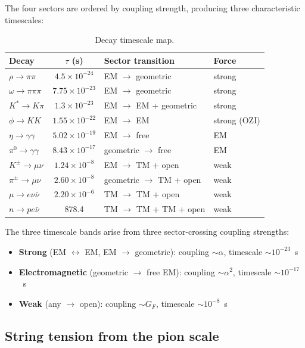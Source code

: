 \documentclass[11pt,a4paper]{article}
\begin{document}
The four sectors are ordered by coupling strength, producing three characteristic timescales:

\begin{table}[h]
\centering
\caption{Decay timescale map.}
\label{tab:timescales}
\small
\begin{tabular}{@{}lcll@{}}
\toprule
Decay & $\tau$ (s) & Sector transition & Force \\
\midrule
$\rho \to \pi\pi$ & $4.5 \times 10^{-24}$ & EM $\to$ geometric & strong \\
$\omega \to \pi\pi\pi$ & $7.75 \times 10^{-23}$ & EM $\to$ geometric & strong \\
$K^* \to K\pi$ & $1.3 \times 10^{-23}$ & EM $\to$ EM + geometric & strong \\
$\phi \to KK$ & $1.55 \times 10^{-22}$ & EM $\to$ EM & strong (OZI) \\
$\eta \to \gamma\gamma$ & $5.02 \times 10^{-19}$ & EM $\to$ free & EM \\
$\pi^0 \to \gamma\gamma$ & $8.43 \times 10^{-17}$ & geometric $\to$ free & EM \\
$K^\pm \to \mu\nu$ & $1.24 \times 10^{-8}$ & EM $\to$ TM + open & weak \\
$\pi^\pm \to \mu\nu$ & $2.60 \times 10^{-8}$ & geometric $\to$ TM + open & weak \\
$\mu \to e\nu\bar\nu$ & $2.20 \times 10^{-6}$ & TM $\to$ TM + open & weak \\
$n \to pe\bar\nu$ & 878.4 & TM $\to$ TM + TM + open & weak \\
\bottomrule
\end{tabular}
\end{table}

The three timescale bands arise from three sector-crossing coupling strengths:
\begin{itemize}
  \item \textbf{Strong} (EM $\leftrightarrow$ EM, EM $\to$ geometric): coupling $\sim \alpha$, timescale $\sim 10^{-23}$~s
  \item \textbf{Electromagnetic} (geometric $\to$ free EM): coupling $\sim \alpha^2$, timescale $\sim 10^{-17}$~s
  \item \textbf{Weak} (any $\to$ open): coupling $\sim G_F$, timescale $\sim 10^{-8}$~s
\end{itemize}

\subsection{String tension from the pion scale}
\end{document}
